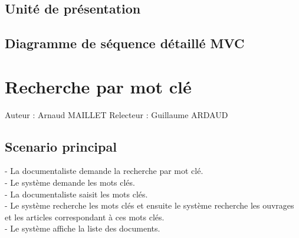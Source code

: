 \documentclass[a4paper,10pt]{report}
\begin{document}
\newpage

\section*{Unité de présentation}

\section*{Diagramme de séquence détaillé MVC}

\newpage


\chapter*{Recherche par mot clé}

Auteur : Arnaud MAILLET
Relecteur : Guillaume ARDAUD

\bigskip
\section*{Scenario principal}
\begin{flushleft}
- La documentaliste demande la recherche par mot clé.\\
- Le système demande les mots clés.\\
- La documentaliste saisit les mots clés.\\
- Le système recherche les mots clés et ensuite le système recherche les ouvrages et les articles correspondant à ces mots clés.\\
- Le système affiche la liste des documents.\\
\end{flushleft}

\bigskip
\end{document}
